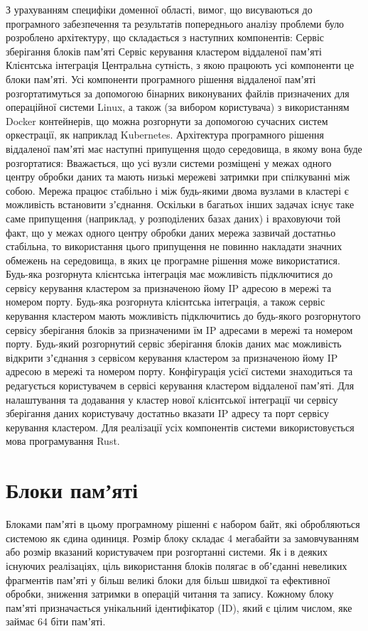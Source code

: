 З урахуванням специфіки доменної області, вимог, що висуваються до програмного забезпечення та результатів попереднього аналізу проблеми було розроблено архітектуру, що складається з наступних компонентів:
Сервіс зберігання блоків памʼяті
Сервіс керування кластером віддаленої памʼяті
Клієнтська інтеграція
	Центральна сутність, з якою працюють усі компоненти це блоки памʼяті.
	Усі компоненти програмного рішення віддаленої памʼяті розгортатимуться за допомогою бінарних виконуваних файлів призначених для операційної системи Linux, а також (за вибором користувача) з використанням Docker контейнерів, що можна розгорнути за допомогою сучасних систем оркестрації, як наприклад Kubernetes.
	Архітектура програмного рішення віддаленої памʼяті має наступні припущення щодо середовища, в якому вона буде розгортатися:
Вважається, що усі вузли системи розміщені у межах одного центру обробки даних та мають низькі мережеві затримки при спілкуванні між собою.
Мережа працює стабільно і між будь-якими двома вузлами в кластері є можливість встановити зʼєднання. Оскільки в багатьох інших задачах існує таке саме припущення (наприклад, у розподілених базах даних) і враховуючи той факт, що у межах одного центру обробки даних мережа зазвичай достатньо стабільна, то використання цього припущення не повинно накладати значних обмежень на середовища, в яких це програмне рішення може використатися.
Будь-яка розгорнута клієнтська інтеграція має можливість підключитися до сервісу керування кластером за призначеною йому IP адресою в мережі та номером порту.
Будь-яка розгорнута клієнтська інтеграція, а також сервіс керування кластером мають можливість підключитись до будь-якого розгорнутого сервісу зберігання блоків за призначеними їм IP адресами в мережі та номером порту.
Будь-який розгорнутий сервіс зберігання блоків даних має можливість відкрити зʼєднання з сервісом керування кластером за призначеною йому IP адресою в мережі та номером порту.
	Конфігурація усієї системи знаходиться та редагується користувачем в сервісі керування кластером віддаленої памʼяті. Для налаштування та додавання у кластер нової клієнтської інтеграції чи сервісу зберігання даних користувачу достатньо вказати IP адресу та порт сервісу керування кластером.
	Для реалізації усіх компонентів системи використовується мова програмування Rust.

\section {Блоки памʼяті}

Блоками памʼяті в цьому програмному рішенні є набором байт, які обробляються системою як єдина одиниця. Розмір блоку складає 4 мегабайти за замовчуванням або розмір вказаний користувачем при розгортанні системи. Як і в деяких існуючих реалізаціях, ціль використання блоків полягає в обʼєданні невеликих фрагментів памʼяті у більш великі блоки для більш швидкої та ефективної обробки, зниження затримки в операцій читання та запису.
	Кожному блоку памʼяті призначається унікальний ідентифікатор (ID), який є цілим числом, яке займає 64 біти памʼяті.

